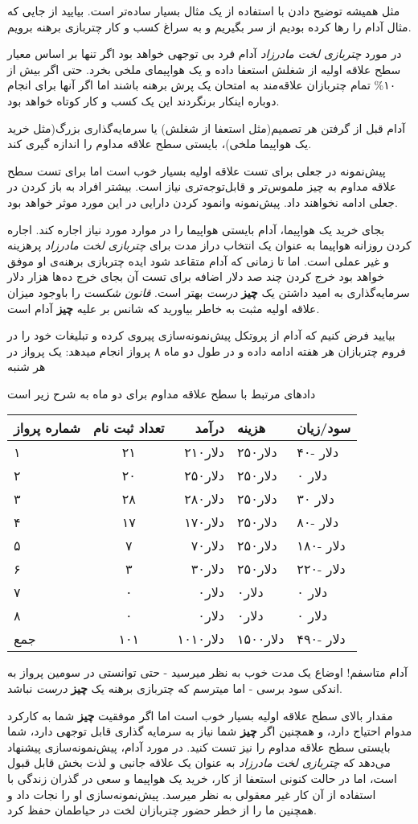 مثل همیشه توضیح دادن با استفاده از یک مثال بسیار ساده‌تر است. بیایید از
جایی که مثال آدام را رها کرده‌ بودیم از سر بگیریم و به سراغ کسب و کار
چتربازی برهنه برویم.

در مورد \emph{چتربازی لخت مادرزاد} آدام فرد بی توجهی خواهد بود اگر تنها
بر اساس معیار سطح علاقه اولیه از شغلش استعفا داده و یک هواپیمای ملخی
بخرد. حتی اگر بیش از ۱۰\% تمام چتربازان علاقه‌مند به امتحان یک پرش برهنه
باشند اما اگر آنها برای انجام دوباره اینکار برنگردند این یک کسب و کار
کوتاه خواهد بود.

آدام قبل از گرفتن هر تصمیم(مثل استعفا از شغلش) یا سرمایه‌گذاری بزرگ(مثل
خرید یک هواپیما ملخی)، بایستی سطح علاقه مداوم را اندازه گیری کند.

پیش‌نمونه در جعلی برای تست علاقه اولیه بسیار خوب است اما برای تست سطح
علاقه مداوم به چیز ملموس‌تر و قابل‌توجه‌تری نیاز است. بیشتر افراد به باز
کردن در جعلی ادامه نخواهند داد. پیش‌نمونه وانمود کردن دارایی در این مورد
موثر خواهد بود.

بجای خرید یک هواپیما، آدام بایستی هواپیما را در موارد مورد نیاز اجاره
کند. اجاره کردن روزانه هواپیما به عنوان یک انتخاب دراز مدت برای
\emph{چتربازی لخت مادرزاد} پرهزینه و غیر عملی است. اما تا زمانی که آدام
متقاعد شود ایده چتربازی برهنه‌ی او موفق خواهد بود خرج کردن چند صد دلار
اضافه برای تست آن بجای خرج ده‌ها هزار دلار سرمایه‌گذاری به امید داشتن یک
\textbf{چیز} \emph{درست} بهتر است. \emph{قانون شکست} را باوجود میزان
علاقه اولیه مثبت به خاطر بیاورید که شانس بر علیه \textbf{چیز} آدام است.

بیایید فرض کنیم که آدام از پروتکل پیش‌نمونه‌سازی پیروی کرده و تبلیغات
خود را در فروم چتربازان هر هفته ادامه داده و در طول دو ماه ۸ پرواز انجام
میدهد: یک پرواز در هر شنبه

دادهای مرتبط با سطح علاقه مداوم برای دو ماه به شرح زیر است

\begin{longtable}[c]{@{}lcrll@{}}
\toprule
شماره پرواز & تعداد ثبت نام & درآمد & هزینه & سود/زیان\tabularnewline
\midrule
\endhead
۱ & ۲۱ & ۲۱۰دلار & ۲۵۰دلار & ۴۰- دلار\tabularnewline
۲ & ۲۰ & ۲۵۰دلار & ۲۵۰دلار & ۰ دلار\tabularnewline
۳ & ۲۸ & ۲۸۰دلار & ۲۵۰دلار & ۳۰ دلار\tabularnewline
۴ & ۱۷ & ۱۷۰دلار & ۲۵۰دلار & ۸۰- دلار\tabularnewline
۵ & ۷ & ۷۰دلار & ۲۵۰دلار & ۱۸۰- دلار\tabularnewline
۶ & ۳ & ۳۰دلار & ۲۵۰دلار & ۲۲۰- دلار\tabularnewline
۷ & ۰ & ۰دلار & ۰دلار & ۰ دلار\tabularnewline
۸ & ۰ & ۰دلار & ۰دلار & ۰ دلار\tabularnewline
جمع & ۱۰۱ & ۱۰۱۰دلار & ۱۵۰۰دلار & ۴۹۰- دلار\tabularnewline
\bottomrule
\end{longtable}

آدام متاسفم! اوضاع یک مدت خوب به نظر میرسید - حتی توانستی در سومین پرواز
به اندکی سود برسی - اما میترسم که چتربازی برهنه یک \textbf{چیز}
\emph{درست} نباشد.

مقدار بالای سطح علاقه اولیه بسیار خوب است اما اگر موفقیت \textbf{چیز}
شما به کارکرد مدوام احتیاج دارد، و همچنین اگر \textbf{چیز} شما نیاز به
سرمایه گذاری قابل توجهی دارد، شما بایستی سطح علاقه مداوم را نیز تست
کنید. در مورد آدام، پیش‌نمونه‌سازی پیشنهاد می‌دهد که \emph{چتربازی لخت
مادرزاد} به عنوان یک علاقه جانبی و لذت بخش قابل قبول است، اما در حالت
کنونی استعفا از کار، خرید یک هواپیما و سعی در گذران زندگی با استفاده از
آن کار غیر معقولی به نظر میرسد. پیش‌نمونه‌سازی او را نجات داد و همچنین
ما را از خطر حضور چتربازان لخت در حیاطمان حفظ کرد.

